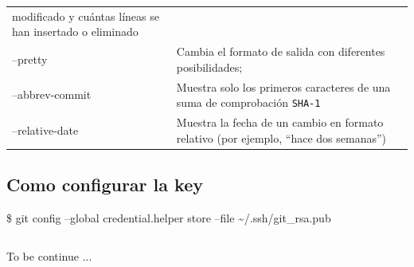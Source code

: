 \documentclass[11pt]{article}
\makeatletter
\newcommand{\boxspacing}{\kern\kvtcb@left@rule\kern\kvtcb@boxsep}
\newcommand{\prompt}[4]{
        {\ttfamily\llap{{\color{#2}[#3]:\hspace{3pt}#4}}\vspace{-\baselineskip}}
    }
\makeatother
\begin{document}
\begin{longtable}[]{@{}ll@{}}
\begin{minipage}[t]{0.73\columnwidth}
modificado y cuántas líneas se han insertado o eliminado\strut
\end{minipage}\tabularnewline
\begin{minipage}[t]{0.21\columnwidth}\raggedright
--pretty\strut
\end{minipage} & \begin{minipage}[t]{0.73\columnwidth}\raggedright
Cambia el formato de salida con diferentes posibilidades;\strut
\end{minipage}\tabularnewline
\begin{minipage}[t]{0.21\columnwidth}\raggedright
--abbrev-commit\strut
\end{minipage} & \begin{minipage}[t]{0.73\columnwidth}\raggedright
Muestra solo los primeros caracteres de una suma de comprobación
\texttt{SHA-1}\strut
\end{minipage}\tabularnewline
\begin{minipage}[t]{0.21\columnwidth}\raggedright
--relative-date\strut
\end{minipage} & \begin{minipage}[t]{0.73\columnwidth}\raggedright
Muestra la fecha de un cambio en formato relativo (por ejemplo, ``hace
dos semanas'')\strut
\end{minipage}\tabularnewline
\bottomrule
\end{longtable}

    \hypertarget{como-configurar-la-key}{%
\subsection{Como configurar la key}\label{como-configurar-la-key}}

\$ git config --global credential.helper store --file
\textasciitilde{}/.ssh/git\_rsa.pub

    \begin{tcolorbox}[breakable, size=fbox, boxrule=1pt, pad at break*=1mm,colback=cellbackground, colframe=cellborder]
\prompt{In}{incolor}{ }{\boxspacing}
\begin{Verbatim}[commandchars=\\\{\}]

\end{Verbatim}
\end{tcolorbox}


To be continue ...
    
    
    
\end{document}
